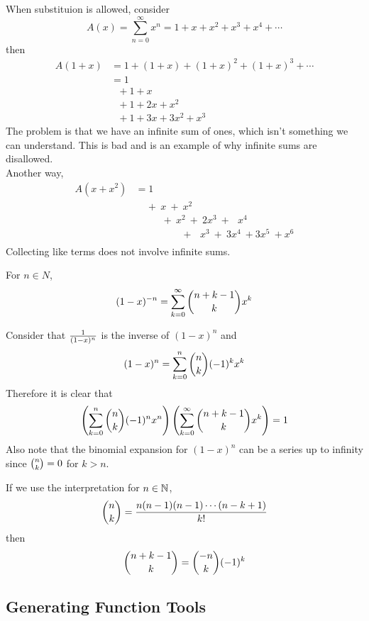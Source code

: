\documentclass[english, 11pt]{article}
\begin{document}
  When substituion is allowed, consider
  \[ A(x) = \sum_{n=0}^{\infty} x^n = 1 + x + x^2 + x^3 + x^4 + \cdots \]
  then
  \begin{align*}
      A(1+x) &= 1 + (1+x) + (1+x)^2 + (1+x)^3 + \cdots \\
      & = 1 \\
      & \ \ \  + 1 + x \\
      & \ \ \ + 1 + 2x + x^2 \\
      & \ \ \ + 1 + 3x + 3x^2 + x^3
   \end{align*}
   The problem is that we have an infinite sum of ones, which isn't something we can understand. This is bad and is an example of why infinite sums are disallowed. \\
   Another way,
   \begin{align*}
     A(x+x^2) & = 1 \\
     & \ \ \ \ \ + \ x \ + \ x^2 \\
     & \ \  \ \ \ \ \ \ \ \ \ \ + \ x^2 \ + \ 2x^3 \ + \ \ \ x^4 \\
     & \ \  \ \ \ \ \ \ \  \ \ \ \ \ \ \ \ \ \ \ \ + \ \ \ x^3 \ + \ 3x^4 \ + 3x^5 \ + x^6 \\
   \end{align*}
   Collecting like terms does not involve infinite sums.

   \begin{thrm}\label{negativebinomial}
     For $n \in N$,
     \[ (1-x)^{-n} = \sum_{k=0}^{\infty} {n+k-1 \choose k} x^k \]
     \begin{note}
       Consider that $\frac{1}{(1-x)^{n}}$ is the inverse of $(1-x)^n$ and
       \[ (1-x)^n = \sum_{k=0}^n {n \choose k} (-1)^k x^k \]
       Therefore it is clear that
       \[ \left( \sum_{k=0}^n {n \choose k} (-1)^n x^n \right)\left( \sum_{k=0}^{\infty} {n+k-1 \choose k} x^k \right) = 1\]
       Also note that the binomial expansion for $(1-x)^n$ can be a series up to infinity since ${n \choose k} = 0$ for $k > n$.
     \end{note}
   \end{thrm}

   If we use the interpretation for $n \in {\mathbb{N}}$,
   \[ {n \choose k} = \frac{n(n-1)(n-1)\cdots(n-k+1)}{k!} \]
   then
   \[ {n+k-1 \choose k} = {-n \choose k}(-1)^k \]

   \subsection{Generating Function Tools}
\end{document}
